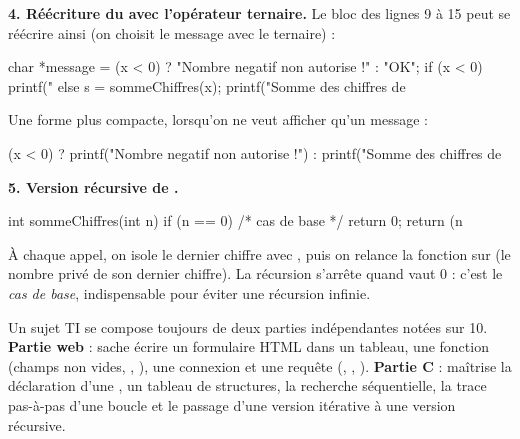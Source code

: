 \medskip
\textbf{4. Réécriture du  avec l'opérateur ternaire.} Le bloc des
lignes 9 à 15 peut se réécrire ainsi (on choisit le message avec le ternaire) :

\begin{codec}
char *message = (x < 0) ? "Nombre negatif non autorise !"
                        : "OK";
if (x < 0)
    printf("%
else {
    s = sommeChiffres(x);
    printf("Somme des chiffres de %
}
\end{codec}

\noindent Une forme plus compacte, lorsqu'on ne veut afficher qu'un message :

\begin{codec}
(x < 0) ? printf("Nombre negatif non autorise !\n")
        : printf("Somme des chiffres de %
\end{codec}

\medskip
\textbf{5. Version récursive de .}

\begin{codec}
int sommeChiffres(int n) {
    if (n == 0)                       /* cas de base */
        return 0;
    return (n %
}
\end{codec}

\begin{remarque}
À chaque appel, on isole le dernier chiffre avec , puis on relance
la fonction sur  (le nombre privé de son dernier chiffre).
La récursion s'arrête quand  vaut 0 : c'est le \emph{cas de base},
indispensable pour éviter une récursion infinie.
\end{remarque}

\begin{aretenir}
Un sujet TI se compose toujours de deux parties indépendantes notées sur 10.
\textbf{Partie web} : sache écrire un formulaire HTML dans un tableau, une
fonction  (champs non vides, , ), une connexion  et une requête (,
, ). \textbf{Partie C} : maîtrise la déclaration d'une
, un tableau de structures, la recherche séquentielle, la trace
pas-à-pas d'une boucle et le passage d'une version itérative à une version
récursive.
\end{aretenir}
